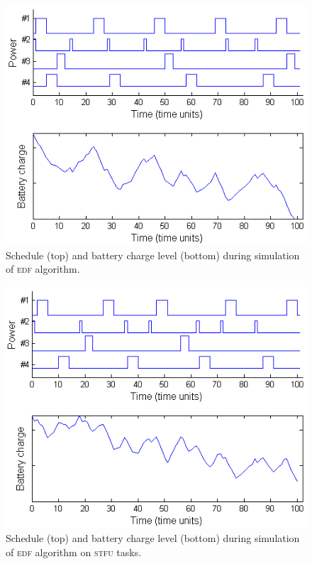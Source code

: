 \begin{figure}[tb]
\begin{center}
\includegraphics[scale=0.57]{edfbattery.png}
\caption{Schedule (top) and battery charge level (bottom) during simulation of \textsc{edf} algorithm.\label{fig:edfbattery}}
\end{center}
\end{figure}

\begin{figure}[tb]
\begin{center}
\includegraphics[scale=0.57]{edfstfubattery.png}
\caption{Schedule (top) and battery charge level (bottom) during simulation of \textsc{edf} algorithm on \textsc{stfu} tasks.\label{fig:edfstfubattery}}
\end{center}
\end{figure}

